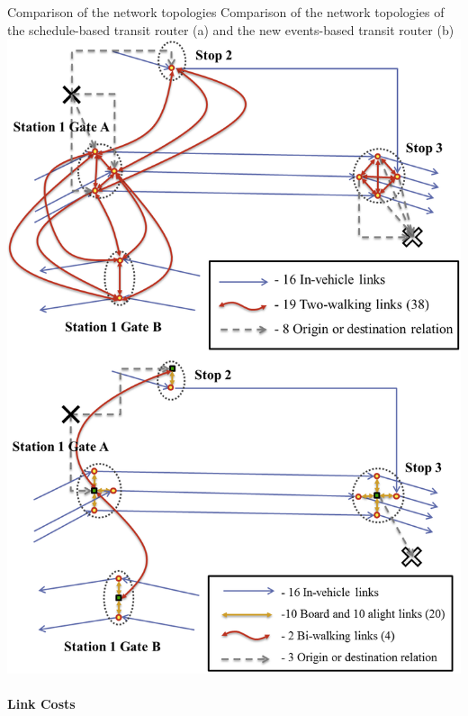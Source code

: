 \createfigure
{Comparison of the network topologies}
{Comparison of the network topologies of the schedule-based transit router (a) and the new events-based transit router (b)}
{\label{fig:Networks}}
{\includegraphics[width=1.0\textwidth]{extending/figures/ebr/Networks.png}}
{}

\paragraph{Link Costs}

